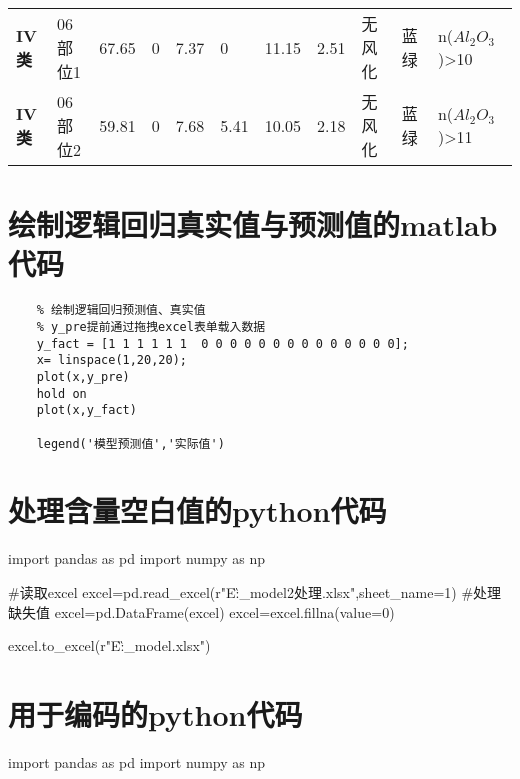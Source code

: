 \documentclass[withoutpreface,bwprint]{cumcmthesis} %
\begin{document}
\begin{appendices}
\begin{table}[!h]
\begin{tabular}{@{}lllllllllll@{}}
		\textbf{IV类}  & 06部位1          & 67.65               & 0                  & 7.37              & 0                 & 11.15               & 2.51              & 无风化           & 蓝绿          & n($Al_2O_3$)>10                        \\
		\textbf{IV类}  & 06部位2          & 59.81               & 0                  & 7.68              & 5.41              & 10.05               & 2.18              & 无风化           & 蓝绿          & n($Al_2O_3$)>11                        \\ \bottomrule
	\end{tabular}
\end{table}

\newpage

\section{绘制逻辑回归真实值与预测值的matlab代码}
\begin{lstlisting}
	% 绘制逻辑回归预测值、真实值
	% y_pre提前通过拖拽excel表单载入数据
	y_fact = [1 1 1 1 1 1  0 0 0 0 0 0 0 0 0 0 0 0 0 0];
	x= linspace(1,20,20);
	plot(x,y_pre)
	hold on 
	plot(x,y_fact)
	
	legend('模型预测值','实际值')
\end{lstlisting}


\section{处理含量空白值的python代码}
\begin{python}
	import pandas as pd
	import numpy as np
	
	#读取excel
	excel=pd.read_excel(r"E:\G\exercise\github{}_model\excel{}2处理.xlsx",sheet_name=1)
	#处理缺失值
	excel=pd.DataFrame(excel)
	excel=excel.fillna(value=0)
	
	excel.to_excel(r"E:\G\exercise\github{}_model\excel{}.xlsx")
\end{python}

\section{用于编码的python代码}
\begin{python}
	import pandas as pd
	import numpy as np
	

\end{python}
\end{appendices}
\end{document}
